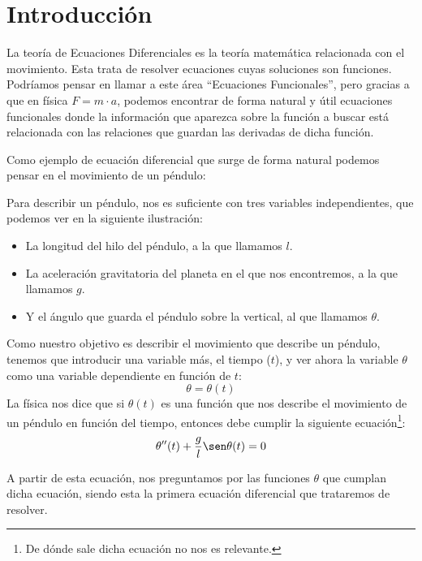 \chapter*{Introducción}

La teoría de Ecuaciones Diferenciales es la teoría matemática relacionada con el movimiento. Esta trata de resolver ecuaciones cuyas soluciones son funciones. Podríamos pensar en llamar a este área ``Ecuaciones Funcionales'', pero gracias a que en física $F = m \cdot a$, podemos encontrar de forma natural y útil ecuaciones funcionales donde la información que aparezca sobre la función a buscar está relacionada con las relaciones que guardan las derivadas de dicha función.

\begin{ejemplo}
    Como ejemplo de ecuación diferencial que surge de forma natural podemos pensar en el movimiento de un péndulo:

    Para describir un péndulo, nos es suficiente con tres variables independientes, que podemos ver en la siguiente ilustración:
    \begin{itemize}
        \item La longitud del hilo del péndulo, a la que llamamos $l$.
        \item La aceleración gravitatoria del planeta en el que nos encontremos, a la que llamamos $g$.
        \item Y el ángulo que guarda el péndulo sobre la vertical, al que llamamos $\theta$.
    \end{itemize}


    Como nuestro objetivo es describir el movimiento que describe un péndulo, tenemos que introducir una variable más, el tiempo ($t$), y ver ahora la variable $\theta$ como una variable dependiente en función de $t$:
    \begin{equation*}
        \theta = \theta(t)
    \end{equation*}
    La física nos dice que si $\theta(t)$ es una función que nos describe el movimiento de un péndulo en función del tiempo, entonces debe cumplir la siguiente ecuación\footnote{De dónde sale dicha ecuación no nos es relevante.}:
    \begin{equation}\label{eq:pendulo}
        \theta''(t) + \frac{g}{l} \sen \theta(t) = 0
    \end{equation}

    A partir de esta ecuación, nos preguntamos por las funciones $\theta$ que cumplan dicha ecuación, siendo esta la primera ecuación diferencial que trataremos de resolver.


\end{ejemplo}
